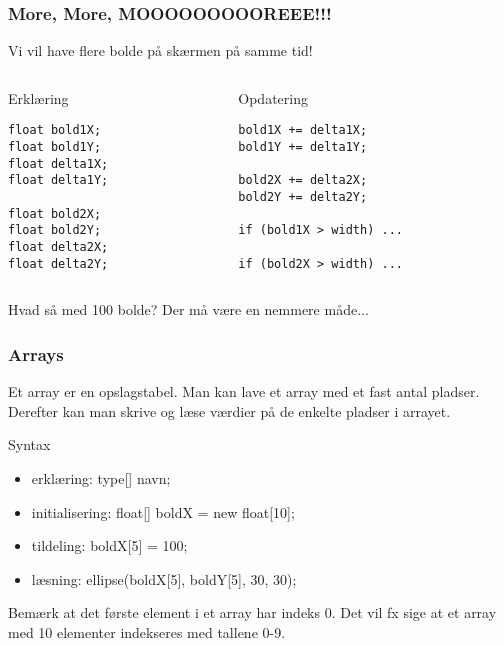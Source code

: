 \documentclass{beamer}
\begin{document}
\begin{frame}[fragile]
  \frametitle{More, More, MOOOOOOOOOREEE!!!}
  
  Vi vil have flere bolde på skærmen på samme tid!
  
  \begin{columns}
    \begin{column}{0.5\textwidth}
      \begin{block}{Erklæring}
\begin{verbatim}
float bold1X;
float bold1Y;
float delta1X;
float delta1Y;

float bold2X;
float bold2Y;
float delta2X;
float delta2Y;
\end{verbatim}
      \end{block}
    \end{column}
    
    \begin{column}{0.5\textwidth}
      \begin{block}{Opdatering}
\begin{verbatim}
bold1X += delta1X;
bold1Y += delta1Y;

bold2X += delta2X;
bold2Y += delta2Y;

if (bold1X > width) ...

if (bold2X > width) ...
\end{verbatim}
      \end{block}
    \end{column}
  \end{columns}
  
  Hvad så med 100 bolde? Der må være en nemmere måde...
\end{frame}


\begin{frame}[fragile]
  \frametitle{Arrays}
  
  Et array er en opslagstabel. Man kan lave et array med et fast antal pladser.
  Derefter kan man skrive og læse værdier på de enkelte pladser i arrayet.
  
  \begin{block}{Syntax}
  \begin{itemize}
  \item erklæring: type[] navn;
  \item initialisering: float[] boldX = new float[10];
  \item tildeling: boldX[5] = 100; 
  \item læsning: ellipse(boldX[5], boldY[5], 30, 30);
  \end{itemize}
  \end{block}
  
  Bemærk at det første element i et array har indeks 0. Det vil fx sige at et array med 10 elementer indekseres med tallene 0-9.
\end{frame}
\end{document}
